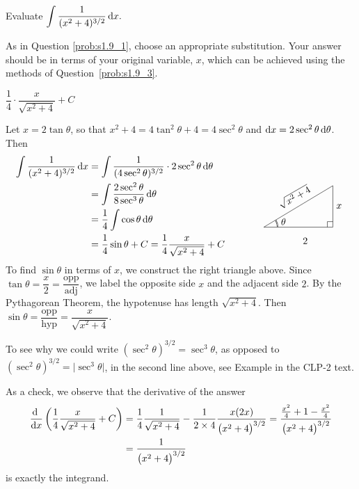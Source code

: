 \subsection*{\Procedural}

\begin{question}[2016Q4]\label{prob:s1.9_P1}
Evaluate $\displaystyle\int \frac1{(x^2+4)^{3/2}} \,\mathrm{d}x.$
\end{question}

\begin{hint} 
As in Question \ref{prob:s1.9_1}, choose an appropriate substitution. Your answer should be in terms of your original variable, $x$, which can be achieved using the methods of Question~\ref{prob:s1.9_3}.
\end{hint}

\begin{answer} 
$\dfrac14\cdot \dfrac x{\sqrt{x^2+4}} + C$
\end{answer}

\begin{solution} 
Let $x = 2\tan\theta$, so that $x^2+4 = 4\tan^2\theta+4=4\sec^2\theta$ and $\mathrm{d}x = 2\sec^2\theta\,\mathrm{d}\theta$. Then
\begin{align*}
\int \frac1{(x^2+4)^{3/2}} \,\dee{x} &= \int \frac1{(4\sec^2\theta)^{3/2}} \cdot 2\sec^2\theta\,\dee{\theta} \\
&= \int \frac{2\sec^2\theta}{8\sec^3\theta} \,\dee{\theta} \\
&=\frac14 \int \cos\theta\,\dee{\theta} \\
&= \frac14\sin\theta+C = \frac14 \frac x{\sqrt{x^2+4}} + C
\qquad\qquad\smash{
\trigtri{\theta}{2}{x}{\sqrt{x^2+4}}}
\end{align*}
To find $\sin\theta$ in terms of $x$, we construct the right triangle above.
Since $\tan\theta = \dfrac{x}{2} = \dfrac{\mbox{opp}}{\mbox{adj}}$, we label the opposite side $x$ and the adjacent side $2$. By the Pythagorean Theorem, the hypotenuse has length $\sqrt{x^2+4}$. Then $\sin\theta = \dfrac{\mbox{opp}}{\mbox{hyp}} = \dfrac{x}{\sqrt{x^2+4}}$. 

To see why we could write $(\sec^2\theta)^{3/2} =\sec^3\theta$, as opposed to 
$(\sec^2\theta)^{3/2} =\big|\sec^3\theta\big|$, in the second line above, see
Example  in the CLP-2 text.

As a check, we observe that the derivative of the answer
\begin{align*}
\diff{}{x} \left(\frac14 \frac x{\sqrt{x^2+4}} +C\right)
&=\frac14\frac 1{\sqrt{x^2+4}} - \frac{1}{2\times 4}\frac{x(2x)}{{\big(x^2+4\big)}^{3/2}}
=\frac{\frac{x^2}{4}+1-\frac{x^2}{4}}{{\big(x^2+4\big)}^{3/2}} \\
&=\frac{1}{{\big(x^2+4\big)}^{3/2}} 
\end{align*}
is exactly the integrand.
\end{solution}

